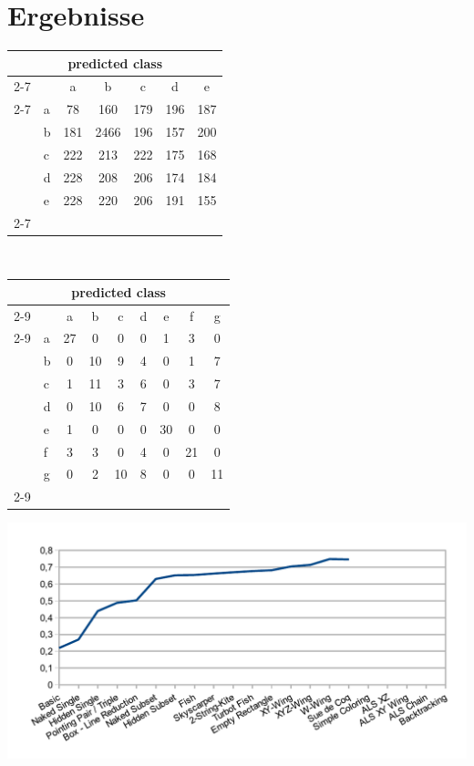 \chapter{Ergebnisse}
\begin{tabular}{ l | l | c c c c c |}
\multicolumn{7}{c}{\textbf{predicted class}}\\
\cline{2-7}
\multirow{6}{*}{\begin{turn}{90}\textbf{actual value}\end{turn}}
& & a & b & c & d & e\\
\cline{2-7}
& a & 78 & 160 & 179 & 196 & 187 \\
& b & 181 & 2466 & 196 & 157 & 200 \\
& c & 222 & 213 & 222 & 175 & 168 \\
& d & 228 & 208 & 206 & 174 & 184 \\
& e & 228 & 220 & 206 & 191 & 155 \\
\cline{2-7}
\end{tabular}
\\
\begin{tabular}{ l | l |  c  c  c  c  c  c  c |}
\multicolumn{9}{c}{\textbf{predicted class}}\\
\cline{2-9}
\multirow{8}{*}{\begin{turn}{90}\textbf{actual value}\end{turn}}
 &  & a & b & c & d & e & f & g\\
\cline{2-9}
& a & 27 & 0 & 0 & 0 & 1 & 3 & 0\\
& b & 0 & 10 & 9 & 4 & 0 & 1 & 7\\
& c & 1 & 11 & 3 & 6 & 0 & 3 & 7\\
& d & 0 & 10 & 6 & 7 & 0 & 0 & 8\\
& e & 1 & 0 & 0 & 0 & 30 & 0 & 0\\
& f & 3 & 3 & 0 & 4 & 0 & 21 & 0\\
& g & 0 & 2 & 10 & 8 & 0 & 0 & 11\\
\cline{2-9}
\end{tabular}

\includegraphics{./img/chart.pdf}

